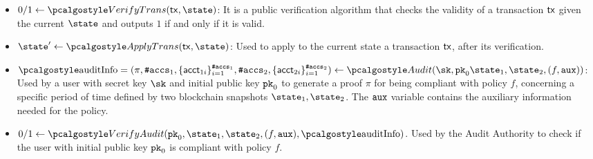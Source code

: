 \begin{itemize}

    \item $0/1 \gets \vertxn(\txn, \state)$: 
    It is a public verification algorithm that checks the validity of a transaction $\textup{\textsf{tx}}$ given the current $\state$ and outputs $1$ if and only if it is valid. 
    
    \item $\state' \gets \applytxn (\txn, \state)$:
        Used to apply to the current state a transaction $\textup{\textsf{tx}}$, after its verification.
    
    \item $\auditinfo = (\pi, {\numaccs}_1, \{ \acct_{1i} \}_{i=1}^{\numaccs_1}, {\numaccs}_2, \{ \acct_{2i} \}_{i=1}^{\numaccs_2}) \gets \audit(\sk,\inpk \snap_{1}, \snap_{2}, (f, \aux))$: 
        Used by a user with secret key $\sk$ and initial public key $\textup{\texttt{pk}}_{0}$ to generate a proof $\pi$ for being compliant with policy $f$, concerning a specific period of time defined by two blockchain snapshots $\snap_1, \snap_2$. 
        The ${\textup{\texttt{aux}}}$ variable contains the auxiliary information needed for the policy. 
    
    \item $0/1 \gets \vera(\inpk, \snap_1, \snap_2, (f,\aux), \auditinfo)$. 
        Used by the Audit Authority to check if the user with initial public key $\textup{\texttt{pk}}_{0}$ is compliant with policy $f$.

    

\end{itemize}